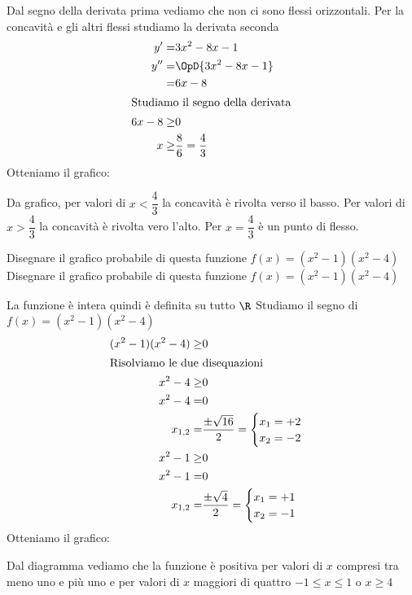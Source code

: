 \begin{exercise}
\begin{itemize}
Dal segno della derivata prima  vediamo che non ci sono flessi orizzontali.
Per la concavità e gli altri flessi studiamo la derivata seconda
\begin{align*}
y'=&3x^2-8x-1\\
y''=&\OpD{3x^2-8x-1}\\
=&6x-8\\
\intertext{Studiamo il segno della derivata}
6x-8\geq&0\\
x\geq&\dfrac{8}{6}=\dfrac{4}{3}\\
\end{align*}
Otteniamo il grafico:
\begin{center}
	
\end{center}
Da grafico, per valori di $x<\dfrac{4}{3}$ la concavità è rivolta verso il basso. Per valori di $x>\dfrac{4}{3}$   la concavità è rivolta vero l'alto. Per $x=\dfrac{4}{3}$ è un punto di flesso.
	\begin{center}
		
	\end{center}
\end{itemize}
\end{exercise}
\begin{exercise}
	Disegnare il grafico probabile di questa funzione $f(x)=(x^2-1)(x^2-4)$
	\tcblower
	Disegnare il grafico probabile di questa funzione $f(x)=(x^2-1)(x^2-4)$

			\begin{itemize}
			La funzione è intera quindi è definita su tutto $\R$
			Studiamo il segno di $f(x)=(x^2-1)(x^2-4)$
			\begin{align*}
			(x^2-1)(x^2-4)\geq&0\\
			\intertext{Risolviamo le due disequazioni}
			x^2-4\geq&0\\
			x^2-4=&0\\
				x_{1,2}=&\dfrac{\pm\sqrt{16}}{2}
			=\begin{cases}
			x_1=+2\\
			x_2=-2
			\end{cases}\\
			x^2-1\geq&0\\
			x^2-1=&0\\
			x_{1,2}=&\dfrac{\pm\sqrt{4}}{2}
			=\begin{cases}
			x_1=+1\\
			x_2=-1
			\end{cases}
			\end{align*}
			Otteniamo il grafico:
			\begin{center}
				
			\end{center}
			Dal diagramma vediamo che la funzione è positiva per valori di $x$ compresi tra meno uno e più uno e per valori di $x$ maggiori di quattro $-1\leq x \leq 1$ o $x\geq 4$
	\end{itemize}
\end{exercise}

